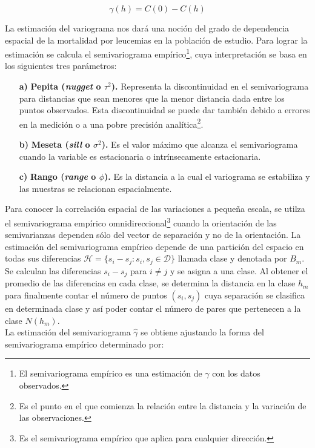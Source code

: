 \documentclass[11pt, oneside]{book}
\begin{document}
$$\gamma(h) = C(0)-C(h)$$

\bigskip

La estimación del variograma nos dará una noción del grado de dependencia espacial de la mortalidad por leucemias en la población de estudio. Para lograr la estimación se calcula el semivariograma empírico\footnote{El semivariograma empírico es una estimación de $\gamma$ con los datos observados.}, cuya interpretación se basa en los siguientes tres parámetros:

\begin{itemize}
  \item[\textbf{a)}] \textbf{Pepita (\emph{nugget} o $\tau^2$).} Representa la discontinuidad en el semivariograma para distancias que sean menores que la menor distancia dada entre los puntos observados. Esta discontinuidad se puede dar también debido a errores en la medición o a una pobre precisión analítica\footnote{Es el punto en el que comienza la relación entre la distancia y la variación de las observaciones.}.
  \item[\textbf{b)}] \textbf{Meseta (\emph{sill} o $\sigma^2$).} Es el valor máximo que alcanza el semivariograma cuando la variable es estacionaria o intrínsecamente estacionaria.
  \item[\textbf{c)}] \textbf{Rango (\emph{range} o $\phi$).} Es la distancia a la cual el variograma se estabiliza y las muestras se relacionan espacialmente.
\end{itemize}

Para conocer la correlación espacial de las variaciones a pequeña escala, se utilza el semivariograma empírico omnidireccional\footnote{Es el semivariograma empírico que aplica para cualquier dirección.} cuando la orientación de las semivarianzas dependen sólo del vector de separación y no de la orientación. La estimación del semivariograma empírico depende de una partición del espacio en todas sus diferencias $\mathcal{H}=\{s_i-s_j:s_i,s_j\in \mathcal{D}\}$ llamada clase y denotada por $B_m$.\\ 

Se calculan las diferencias $s_i-s_j$ para $i\neq j$ y se asigna a una clase. Al obtener el promedio de las diferencias en cada clase, se determina la distancia en la clase $h_m$ para finalmente contar el número de puntos $(s_i,s_j)$ cuya separación se clasifica en determinada clase y así poder contar el número de pares que pertenecen a la clase $N(h_m)$.\\

La estimación del semivariograma $\hat{\gamma}$ se obtiene ajustando la forma del semivariograma empírico determinado por:
\end{document}
